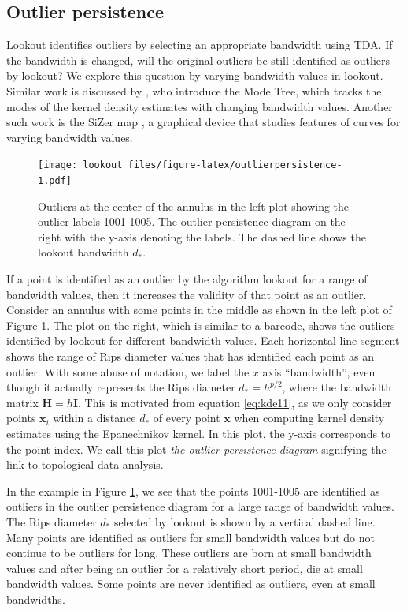 \documentclass[11pt,a4paper,]{article}
\theoremstyle{definition}
\theoremstyle{definition}
\theoremstyle{definition}
\theoremstyle{remark}
\begin{document}
\hypertarget{subsec:persistence}{%
\subsection{Outlier persistence}\label{subsec:persistence}}

Lookout identifies outliers by selecting an appropriate bandwidth using TDA. If the bandwidth is changed, will the original outliers be still identified as outliers by lookout? We explore this question by varying bandwidth values in lookout. Similar work is discussed by \textcite{Minnotte1993}, who introduce the Mode Tree, which tracks the modes of the kernel density estimates with changing bandwidth values. Another such work is the SiZer map \autocite{Chaudhuri1999}, a graphical device that studies features of curves for varying bandwidth values.

\begin{figure}
\centering
\texttt{[image: lookout\_files/figure-latex/outlierpersistence-1.pdf]}
\caption{\label{fig:outlierpersistence}Outliers at the center of the annulus in the left plot showing the outlier labels 1001-1005. The outlier persistence diagram on the right with the y-axis denoting the labels. The dashed line shows the lookout bandwidth \(d_*\).}
\end{figure}

If a point is identified as an outlier by the algorithm lookout for a range of bandwidth values, then it increases the validity of that point as an outlier. Consider an annulus with some points in the middle as shown in the left plot of Figure \ref{fig:outlierpersistence}. The plot on the right, which is similar to a barcode, shows the outliers identified by lookout for different bandwidth values. Each horizontal line segment shows the range of Rips diameter values that has identified each point as an outlier. With some abuse of notation, we label the \(x\) axis ``bandwidth'', even though it actually represents the Rips diameter \(d_* = h^{p/2}\), where the bandwidth matrix \(\bm{H} = h\bm{I}\). This is motivated from equation \eqref{eq:kde11}, as we only consider points \(\bm{x}_i\) within a distance \(d_*\) of every point \(\bm{x}\) when computing kernel density estimates using the Epanechnikov kernel. In this plot, the y-axis corresponds to the point index. We call this plot \emph{the outlier persistence diagram} signifying the link to topological data analysis.

In the example in Figure \ref{fig:outlierpersistence}, we see that the points 1001-1005 are identified as outliers in the outlier persistence diagram for a large range of bandwidth values. The Rips diameter \(d_*\) selected by lookout is shown by a vertical dashed line. Many points are identified as outliers for small bandwidth values but do not continue to be outliers for long. These outliers are born at small bandwidth values and after being an outlier for a relatively short period, die at small bandwidth values. Some points are never identified as outliers, even at small bandwidths.
\end{document}
